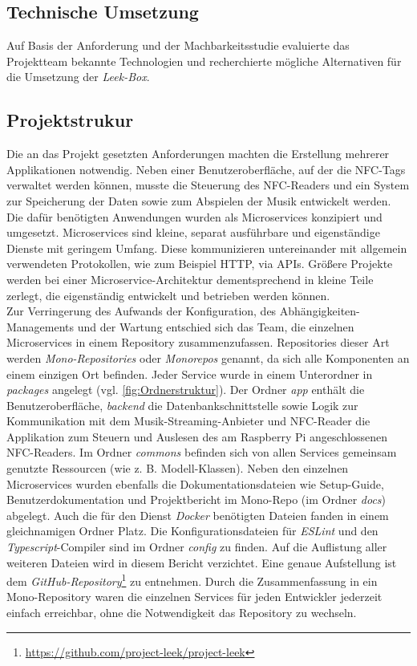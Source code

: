\documentclass[10pt, a4paper]{article}
\begin{document}
\begin{onehalfspace}
\section{Technische Umsetzung}
  Auf Basis der Anforderung und der Machbarkeitsstudie evaluierte das Projektteam bekannte Technologien und recherchierte mögliche Alternativen für die Umsetzung der \textit{Leek-Box}.
  \subsection{Projektstrukur}
  Die an das Projekt gesetzten Anforderungen machten die Erstellung mehrerer Applikationen notwendig. Neben einer Benutzeroberfläche, auf der die NFC-Tags
  verwaltet werden können, musste die Steuerung des NFC-Readers und ein System zur Speicherung der Daten sowie zum Abspielen der Musik entwickelt werden.
  Die dafür benötigten Anwendungen wurden als Microservices konzipiert und umgesetzt.
  Microservices sind kleine, separat ausführbare und eigenständige Dienste mit geringem Umfang.
  Diese kommunizieren untereinander mit allgemein verwendeten Protokollen, wie zum Beispiel HTTP, via APIs.
  Größere Projekte werden bei einer Microservice-Architektur dementsprechend in kleine Teile zerlegt,
   die eigenständig entwickelt und betrieben werden können. \cite{Microservices}\\
  Zur Verringerung des Aufwands der Konfiguration, des Abhängigkeiten-Managements und der Wartung entschied sich das Team, die einzelnen Microservices in einem Repository zusammenzufassen. \cite{Monorepo}
  Repositories dieser Art werden \textit{Mono-Repositories} oder \textit{Monorepos} genannt, da sich alle Komponenten an einem einzigen Ort befinden.
  Jeder Service wurde in einem Unterordner in \textit{packages} angelegt (vgl. \autoref{fig:Ordnerstruktur}). Der Ordner \textit{app} enthält die Benutzeroberfläche,
  \textit{backend} die Datenbankschnittstelle sowie Logik zur Kommunikation mit dem Musik-Streaming-Anbieter und NFC-Reader die Applikation zum Steuern und Auslesen des am Raspberry Pi angeschlossenen NFC-Readers.
  Im Ordner \textit{commons} befinden sich von allen Services gemeinsam genutzte Ressourcen (wie z. B. Modell-Klassen).
  Neben den einzelnen Microservices wurden ebenfalls die Dokumentationsdateien wie Setup-Guide, Benutzerdokumentation und Projektbericht im Mono-Repo (im Ordner \textit{docs}) abgelegt.
  Auch die für den Dienst \textit{Docker} benötigten Dateien fanden in einem gleichnamigen Ordner Platz. Die Konfigurationsdateien für \textit{ESLint} und den \textit{Typescript}-Compiler sind im Ordner \textit{config} zu finden.
  Auf die Auflistung aller weiteren Dateien wird in diesem Bericht verzichtet. Eine genaue Aufstellung ist dem \textit{GitHub-Repository}\footnote{\url{https://github.com/project-leek/project-leek}} zu entnehmen.
  Durch die Zusammenfassung in ein Mono-Repository waren die einzelnen Services für jeden Entwickler jederzeit einfach erreichbar, ohne die Notwendigkeit das Repository zu wechseln.


\end{onehalfspace}
\end{document}
